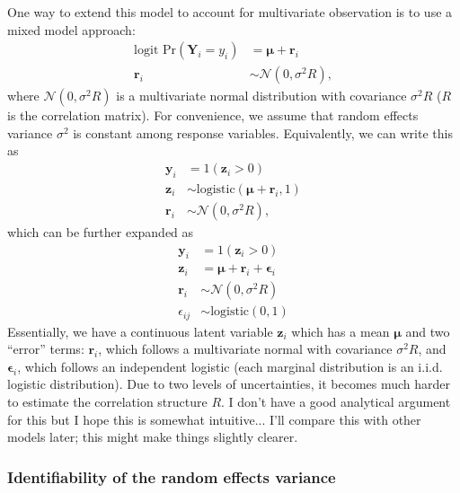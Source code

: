 \documentclass{article}\usepackage[]{graphicx}\usepackage[]{color}
\begin{document}
One way to extend this model to account for multivariate observation is to use a mixed model approach: 
\begin{equation}
\begin{aligned}
\textrm{logit Pr}(\mathbf Y_i = y_i) &= \pmb \mu + \mathbf r_i\\
\mathbf r_i &\sim \mathcal{N}(0, \sigma^2 R),
\end{aligned}
\end{equation}
where $\mathcal N(0, \sigma^2 R)$ is a multivariate normal distribution with covariance $\sigma^2 R$ ($R$ is the correlation matrix). For convenience, we assume that random effects variance $\sigma^2$ is constant among response variables.
Equivalently, we can write this as
\begin{equation}
\begin{aligned}
\mathbf y_i &= 1(\mathbf z_i > 0)\\
\mathbf z_i &\sim \mathrm{logistic}(\pmb \mu + \mathbf r_i, 1)\\
\mathbf r_i &\sim \mathcal{N}(0, \sigma^2 R),
\end{aligned}
\end{equation}
which can be further expanded as 
\begin{equation}
\begin{aligned}
\mathbf y_i &= 1(\mathbf z_i > 0)\\
\mathbf z_i &= \pmb \mu + \mathbf r_i + \pmb \epsilon_i\\
\mathbf r_i &\sim \mathcal{N}(0, \sigma^2 R)\\
\epsilon_{ij} &\sim \mathrm{logistic}(0, 1)
\end{aligned}
\end{equation}
Essentially, we have a continuous latent variable $\mathbf z_i$ which has a mean $\pmb \mu$ and two ``error'' terms: $\mathbf r_i$, which follows a multivariate normal with covariance $\sigma^2 R$, and $\pmb \epsilon_i$, which follows an independent logistic (each marginal distribution is an i.i.d. logistic distribution).
Due to two levels of uncertainties, it becomes much harder to estimate the correlation structure $R$.
I don't have a good analytical argument for this but I hope this is somewhat intuitive... I'll compare this with other models later; this might make things slightly clearer.

\subsubsection*{Identifiability of the random effects variance}
\end{document}
